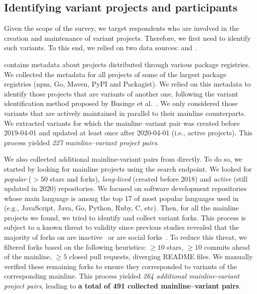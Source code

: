 

\subsection{Identifying variant projects and participants}
\label{sec:forks_and_participants}

Given the scope of the survey, we target respondents who are involved in the creation and maintenance of variant projects.
Therefore, we first need to identify such variants.
To this end, we relied on two data sources: \librariesio and \gh.

\librariesio contains metadata about projects distributed through various package registries. We collected the metadata for all projects of some of the largest package registries (\textsf{npm, Go, Maven, PyPI} and \textsf{Packagist}). We relied on this metadata to identify those projects that are variants of another one, following the variant identification method proposed by  Businge et al.~\cite{businge:emse:2021,businge:benevol:2020}. %
We only considered those variants that are actively maintained in parallel to their mainline counterparts. We extracted variants for which the mainline--variant pair was created before 2019-04-01 and updated at least once after 2020-04-01 (i.e., active projects).
This process yielded \textit{227 mainline–variant project pairs}.

We also collected additional mainline-variant pairs from \gh directly.
To do so, we started by looking for mainline projects using the \gh search endpoint. We looked for \emph{popular} ($>50$ stars and forks), \emph{long-lived} (created before 2018) and \emph{active} (still updated in 2020) repositories.
We focused on software development repositories whose main language is among the top 17 of most popular languages used in \gh (e.g., \textsf{JavaScript, Java, Go, Python, Ruby, C}, etc).
Then, for all the mainline projects we found, we tried to  identify and collect variant forks. This process is subject to a known threat to validity since previous studies revealed that the majority of forks on \gh are inactive~\cite{businge:2019Saner,Businge:2017} or are social forks~\cite{businge:2018icsme}.
To reduce this threat, we filtered forks based on  the following heuristics: $\geq 10$ stars, $\geq 10$ commits ahead of the mainline, $\geq 5$ closed pull requests, diverging \textsf{README} files.
We manually verified these remaining forks to ensure they corresponded to variants  of the corresponding mainline.
This process yielded \textit{264 additional mainline-variant project pairs},
leading to \textbf{a total of 491 collected mainline--variant pairs}.

